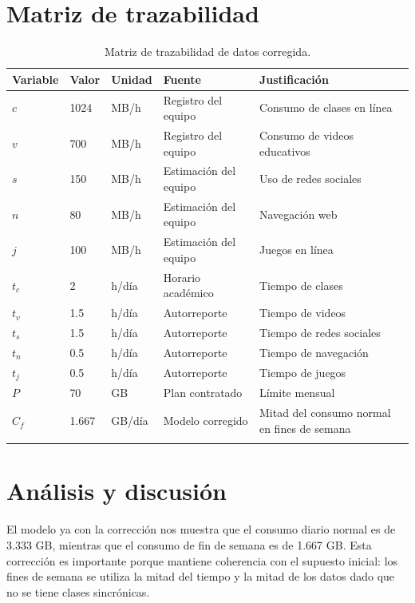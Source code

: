 \documentclass[12pt,a4paper]{article}
\begin{document}
	\section{Matriz de trazabilidad}
	
	\begin{longtable}{|p{3cm}|p{2cm}|p{2cm}|p{4cm}|p{4cm}|}
		\hline
		\rowcolor{azulclaro}
		\textbf{Variable} & \textbf{Valor} & \textbf{Unidad} & \textbf{Fuente} & \textbf{Justificación} \\ \hline
		$c$ & 1024 & MB/h & Registro del equipo & Consumo de clases en línea \\ \hline
		$v$ & 700 & MB/h & Registro del equipo & Consumo de videos educativos \\ \hline
		$s$ & 150 & MB/h & Estimación del equipo & Uso de redes sociales \\ \hline
		$n$ & 80 & MB/h & Estimación del equipo & Navegación web \\ \hline
		$j$ & 100 & MB/h & Estimación del equipo & Juegos en línea \\ \hline
		$t_c$ & 2 & h/día & Horario académico & Tiempo de clases \\ \hline
		$t_v$ & 1.5 & h/día & Autorreporte & Tiempo de videos \\ \hline
		$t_s$ & 1.5 & h/día & Autorreporte & Tiempo de redes sociales \\ \hline
		$t_n$ & 0.5 & h/día & Autorreporte & Tiempo de navegación \\ \hline
		$t_j$ & 0.5 & h/día & Autorreporte & Tiempo de juegos \\ \hline
		$P$ & 70 & GB & Plan contratado & Límite mensual \\ \hline
		$C_f$ & 1.667 & GB/día & Modelo corregido & Mitad del consumo normal en fines de semana \\ \hline
		\caption{Matriz de trazabilidad de datos corregida.}
	\end{longtable}
	
	\section{Análisis y discusión}
	
	El modelo ya con la corrección nos muestra que el consumo diario normal es de 3.333 GB, mientras que el consumo de fin de semana es de 1.667 GB. Esta corrección es importante porque mantiene coherencia con el supuesto inicial: los fines de semana se utiliza la mitad del tiempo y la mitad de los datos dado que no se tiene clases sincrónicas.
	
\end{document}
